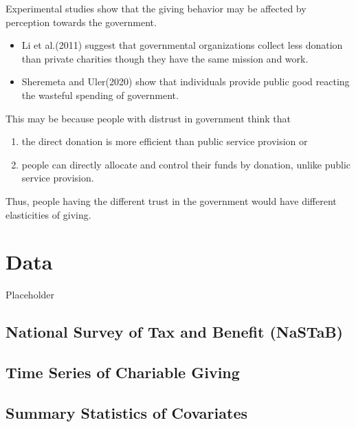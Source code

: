 \documentclass[ review  , 3p ]{elsarticle}
\providecommand{\tightlist}{%
  \setlength{\itemsep}{0pt}\setlength{\parskip}{0pt}}
\begin{document}
  Experimental studies show that the giving behavior may be affected by perception towards the government.
  
  \begin{itemize}
  \tightlist
  \item
    Li et al.(2011) suggest that governmental organizations collect less donation than private charities though they have the same mission and work.
  \item
    Sheremeta and Uler(2020) show that individuals provide public good reacting the wasteful spending of government.
  \end{itemize}
  
  This may be because people with distrust in government think that
  
  \begin{enumerate}
  \def\labelenumi{\arabic{enumi}.}
  \tightlist
  \item
    the direct donation is more efficient than public service provision or
  \item
    people can directly allocate and control their funds by donation, unlike public service provision.
  \end{enumerate}
  
  Thus, people having the different trust in the government would have different elasticities of giving.
  
  \hypertarget{data}{%
  \section{Data}\label{data}}
  
  Placeholder
  
  \hypertarget{national-survey-of-tax-and-benefit-nastab}{%
  \subsection{National Survey of Tax and Benefit (NaSTaB)}\label{national-survey-of-tax-and-benefit-nastab}}
  
  \hypertarget{time-series-of-chariable-giving}{%
  \subsection{Time Series of Chariable Giving}\label{time-series-of-chariable-giving}}
  
  \hypertarget{summary-statistics-of-covariates}{%
  \subsection{Summary Statistics of Covariates}\label{summary-statistics-of-covariates}}
  
\end{document}
